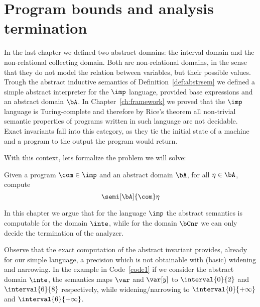 \chapter{Program bounds and analysis termination}\label{ch:axiomatized}

In the last chapter we defined two abstract domains: the interval
domain and the non-relational collecting domain. Both are
non-relational domains, in the sense that they do not model the
relation between variables, but their possible values. Trough the
abstract inductive semantics of Definition~\ref{def:abstrsem} we
defined a simple abstract interpreter for the \(\imp\) language,
provided base expressions and an abstract domain \(\bA\). In
Chapter~\ref{ch:framework} we proved that the \(\imp\) language is
Turing-complete and therefore by Rice's theorem all non-trivial
semantic properties of programs written in such language are not
decidable.  
Exact invariants fall into this category, as they tie the initial
state of a machine and a program to the output the program would
return.

With this context, lets formalize the problem we will solve:

\begin{problem}\label{problem1}
  Given a program \(\com\in \imp\) and an abstract domain \(\bA\), for
  all \(\eta \in \bA\), compute
  \begin{equation*}
    \semi[\bA]{\com} \eta
  \end{equation*}
\end{problem}

In this chapter we argue that for the language \(\imp\) the abstract
semantics is computable for the domain \(\inte\), while for the domain
\(\bCnr\) we can only decide the termination of the analyzer.

\medskip

Observe that the exact computation of the abstract invariant provides,
already for our simple language, a precision which is not obtainable
with (basic) widening and narrowing. In the example in
Code~\ref{code1} if we consider the abstract domain \(\inte\), the
semantics maps \(\var\) and \(\var[y]\) to \(\interval{0}{2}\) and
\(\interval{6}{8}\) respectively, while widening/narrowing to
\(\interval{0}{+\infty}\) and \(\interval{6}{+\infty}\).

